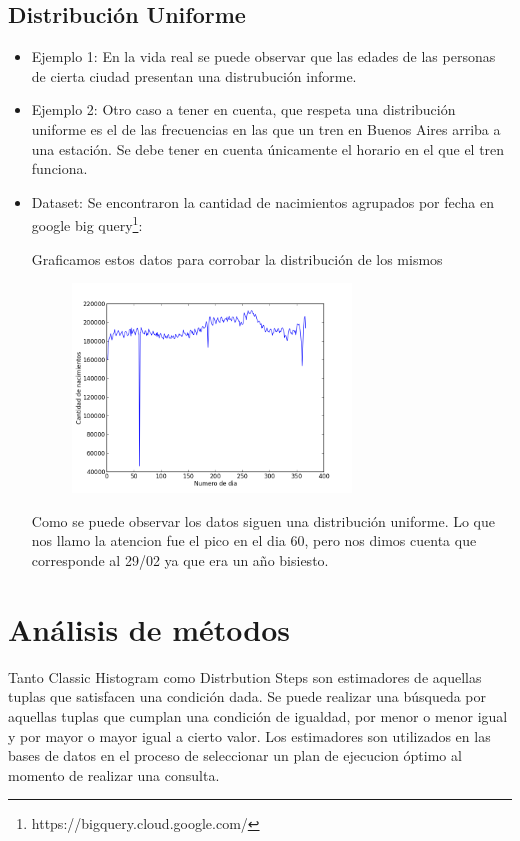 \documentclass[10pt, a4paper,english,spanish,hidelinks]{article}
\begin{document}
\subsection{Distribución Uniforme}
\begin{itemize}
\item Ejemplo 1: En la vida real se puede observar que las edades de las personas de cierta ciudad presentan una distrubución informe. 

\item Ejemplo 2: Otro caso a tener en cuenta, que respeta una distribución uniforme es el de las frecuencias en las que un tren en Buenos Aires arriba a una estación. Se debe tener en cuenta únicamente el horario en el que el tren funciona. 

\item Dataset: Se encontraron la cantidad de nacimientos agrupados por fecha en google big query\footnote{https://bigquery.cloud.google.com/}:

Graficamos estos datos para corrobar la distribución de los mismos

\begin{figure}[h!]
  \centering
  \includegraphics[width=0.7\textwidth]{./imagenes/ejemplo_dia_nacimiento.png}
  \caption{}
\end{figure}

  Como se puede observar los datos siguen una distribución uniforme. Lo que nos 
llamo la atencion fue el pico en el dia 60, pero nos dimos cuenta que 
corresponde al 29/02 ya que era un año bisiesto. 

\end{itemize}

\newpage
\section{Análisis de métodos}
Tanto Classic Histogram como Distrbution Steps son estimadores de aquellas tuplas que satisfacen una condición dada. Se puede realizar una búsqueda por aquellas tuplas que cumplan una condición de igualdad, por menor o menor igual y por mayor o mayor igual a cierto valor. Los estimadores son utilizados en las bases de datos en el proceso de seleccionar un plan de ejecucion óptimo 
al momento de realizar una consulta.
\end{document}
